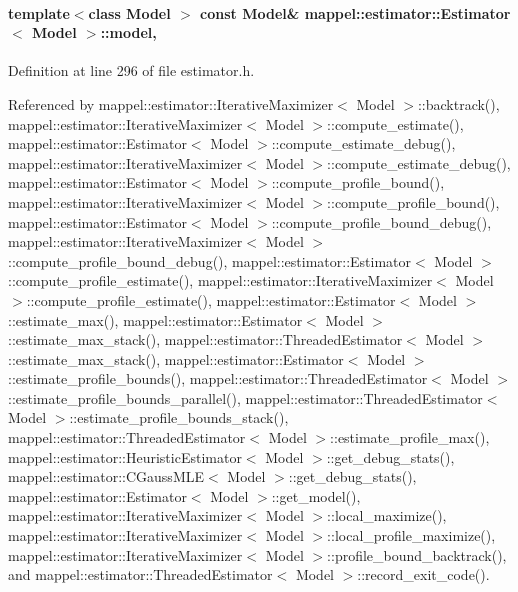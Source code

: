 \paragraph[{\texorpdfstring{model}{model}}]{\setlength{\rightskip}{0pt plus 5cm}template$<$class Model $>$ const Model\& {\bf mappel\+::estimator\+::\+Estimator}$<$ Model $>$\+::model\hspace{0.3cm}{\ttfamily [protected]}, {\ttfamily [inherited]}}\hypertarget{classmappel_1_1estimator_1_1Estimator_a2f157410771fb79a20d4d54e505750d0}{}\label{classmappel_1_1estimator_1_1Estimator_a2f157410771fb79a20d4d54e505750d0}


Definition at line 296 of file estimator.\+h.



Referenced by mappel\+::estimator\+::\+Iterative\+Maximizer$<$ Model $>$\+::backtrack(), mappel\+::estimator\+::\+Iterative\+Maximizer$<$ Model $>$\+::compute\+\_\+estimate(), mappel\+::estimator\+::\+Estimator$<$ Model $>$\+::compute\+\_\+estimate\+\_\+debug(), mappel\+::estimator\+::\+Iterative\+Maximizer$<$ Model $>$\+::compute\+\_\+estimate\+\_\+debug(), mappel\+::estimator\+::\+Estimator$<$ Model $>$\+::compute\+\_\+profile\+\_\+bound(), mappel\+::estimator\+::\+Iterative\+Maximizer$<$ Model $>$\+::compute\+\_\+profile\+\_\+bound(), mappel\+::estimator\+::\+Estimator$<$ Model $>$\+::compute\+\_\+profile\+\_\+bound\+\_\+debug(), mappel\+::estimator\+::\+Iterative\+Maximizer$<$ Model $>$\+::compute\+\_\+profile\+\_\+bound\+\_\+debug(), mappel\+::estimator\+::\+Estimator$<$ Model $>$\+::compute\+\_\+profile\+\_\+estimate(), mappel\+::estimator\+::\+Iterative\+Maximizer$<$ Model $>$\+::compute\+\_\+profile\+\_\+estimate(), mappel\+::estimator\+::\+Estimator$<$ Model $>$\+::estimate\+\_\+max(), mappel\+::estimator\+::\+Estimator$<$ Model $>$\+::estimate\+\_\+max\+\_\+stack(), mappel\+::estimator\+::\+Threaded\+Estimator$<$ Model $>$\+::estimate\+\_\+max\+\_\+stack(), mappel\+::estimator\+::\+Estimator$<$ Model $>$\+::estimate\+\_\+profile\+\_\+bounds(), mappel\+::estimator\+::\+Threaded\+Estimator$<$ Model $>$\+::estimate\+\_\+profile\+\_\+bounds\+\_\+parallel(), mappel\+::estimator\+::\+Threaded\+Estimator$<$ Model $>$\+::estimate\+\_\+profile\+\_\+bounds\+\_\+stack(), mappel\+::estimator\+::\+Threaded\+Estimator$<$ Model $>$\+::estimate\+\_\+profile\+\_\+max(), mappel\+::estimator\+::\+Heuristic\+Estimator$<$ Model $>$\+::get\+\_\+debug\+\_\+stats(), mappel\+::estimator\+::\+C\+Gauss\+M\+L\+E$<$ Model $>$\+::get\+\_\+debug\+\_\+stats(), mappel\+::estimator\+::\+Estimator$<$ Model $>$\+::get\+\_\+model(), mappel\+::estimator\+::\+Iterative\+Maximizer$<$ Model $>$\+::local\+\_\+maximize(), mappel\+::estimator\+::\+Iterative\+Maximizer$<$ Model $>$\+::local\+\_\+profile\+\_\+maximize(), mappel\+::estimator\+::\+Iterative\+Maximizer$<$ Model $>$\+::profile\+\_\+bound\+\_\+backtrack(), and mappel\+::estimator\+::\+Threaded\+Estimator$<$ Model $>$\+::record\+\_\+exit\+\_\+code().

